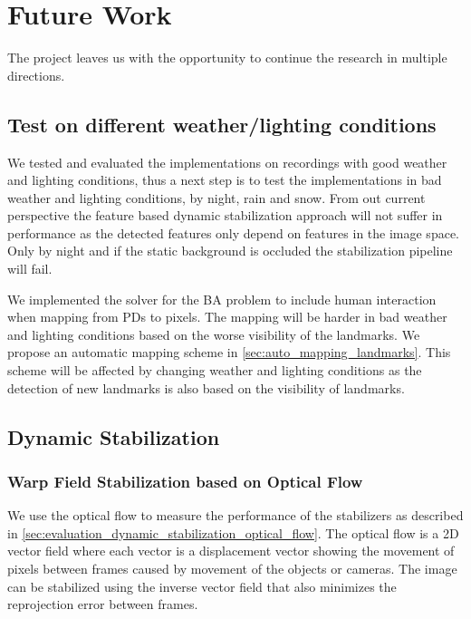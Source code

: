 
\section{Future Work}
The project leaves us with the opportunity to continue the research in multiple directions.

\subsection{Test on different weather/lighting conditions}
We tested and evaluated the implementations on recordings with good weather and lighting conditions, thus a next step is to test the implementations in bad weather and lighting conditions, \eg by night, rain and snow.
From out current perspective the feature based dynamic stabilization approach will not suffer in performance as the detected features only depend on features in the image space. 
Only by night and if the static background is occluded the stabilization pipeline will fail.

We implemented the solver for the BA problem to include human interaction when mapping from PDs to pixels.
The mapping will be harder in bad weather and lighting conditions based on the worse visibility of the landmarks.
We propose an automatic mapping scheme in \autoref{sec:auto_mapping_landmarks}.
This scheme will be affected by changing weather and lighting conditions as the detection of new landmarks is also based on the visibility of landmarks.


\subsection{Dynamic Stabilization}

\subsubsection{Warp Field Stabilization based on Optical Flow}
We use the optical flow to measure the performance of the stabilizers as described in  \autoref{sec:evaluation_dynamic_stabilization_optical_flow}.
The optical flow is a 2D vector field where each vector is a displacement vector showing the movement of pixels between frames caused by movement of the objects or cameras.
The image can be stabilized using the inverse vector field that also minimizes the reprojection error between frames.


